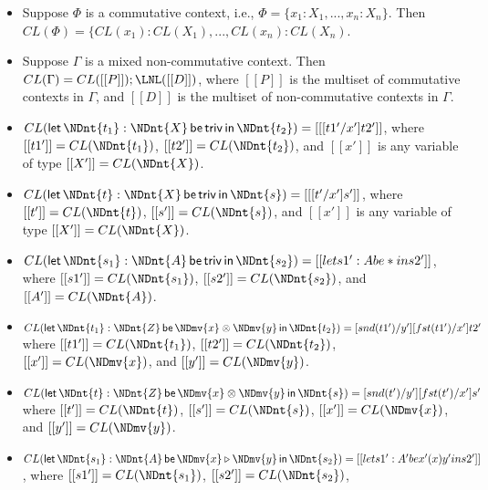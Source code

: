 \begin{definition}
\begin{itemize}
  \item Suppose $\Phi$ is a commutative context, i.e.,
        $\Phi=\{x_1:X_1,...,x_n:X_n\}$. Then \\
        $CL(\Phi)=\{CL(x_1):CL(X_1),...,CL(x_n):CL(X_n)$.
  \item Suppose $\Gamma$ is a mixed non-commutative context. Then
        $CL(\Gamma)=CL([[P]]);\LNL([[D]])$, where $[[P]]$ is the multiset of
        commutative contexts in $\Gamma$, and $[[D]]$ is the multiset of
        non-commutative contexts in $\Gamma$.
  \item $CL( \mathsf{let}\, \NDnt{t_{{\mathrm{1}}}}  :  \NDnt{X} \,\mathsf{be}\,  \mathsf{triv}  \,\mathsf{in}\, \NDnt{t_{{\mathrm{2}}}} ) = [[ [ t1' / x' ] t2' ]]$,
        where $[[t1']] = CL(\NDnt{t_{{\mathrm{1}}}})$, $[[t2']] = CL(\NDnt{t_{{\mathrm{2}}}})$, and $[[x']]$
        is any variable of type $[[X']] = CL(\NDnt{X})$.
  \item $CL( \mathsf{let}\, \NDnt{t}  :  \NDnt{X} \,\mathsf{be}\,  \mathsf{triv}  \,\mathsf{in}\, \NDnt{s} ) = [[ [ t' / x' ] s' ]]$,
        where $[[t']] = CL(\NDnt{t})$, $[[s']] = CL(\NDnt{s})$, and $[[x']]$
        is any variable of type $[[X']] = CL(\NDnt{X})$.
  \item $CL( \mathsf{let}\, \NDnt{s_{{\mathrm{1}}}}  :  \NDnt{A} \,\mathsf{be}\,  \mathsf{triv}  \,\mathsf{in}\, \NDnt{s_{{\mathrm{2}}}} ) = [[let s1' : A be * in s2']]$,
        where $[[s1']] = CL(\NDnt{s_{{\mathrm{1}}}})$, $[[s2']] = CL(\NDnt{s_{{\mathrm{2}}}})$, and
        $[[A']] = CL(\NDnt{A})$.
  \item $CL( \mathsf{let}\, \NDnt{t_{{\mathrm{1}}}}  :  \NDnt{Z} \,\mathsf{be}\, \NDmv{x}  \otimes  \NDmv{y} \,\mathsf{in}\, \NDnt{t_{{\mathrm{2}}}} ) = [snd(t1') / y'][fst(t1') / x']t2'$
        where $[[t1']] = CL(\NDnt{t_{{\mathrm{1}}}})$, $[[t2']] = CL(\NDnt{t_{{\mathrm{2}}}})$,
        $[[x']] = CL(\NDmv{x})$, and $[[y']] = CL(\NDmv{y})$.
  \item $CL( \mathsf{let}\, \NDnt{t}  :  \NDnt{Z} \,\mathsf{be}\, \NDmv{x}  \otimes  \NDmv{y} \,\mathsf{in}\, \NDnt{s} ) = [snd(t') / y'][fst(t') / x']s'$
        where $[[t']] = CL(\NDnt{t})$, $[[s']] = CL(\NDnt{s})$,
        $[[x']] = CL(\NDmv{x})$, and $[[y']] = CL(\NDmv{y})$.
  \item $CL( \mathsf{let}\, \NDnt{s_{{\mathrm{1}}}}  :  \NDnt{A} \,\mathsf{be}\, \NDmv{x}  \triangleright  \NDmv{y} \,\mathsf{in}\, \NDnt{s_{{\mathrm{2}}}} ) = [[let s1' : A' be x' (x) y' in s2']]$,
        where $[[s1']] = CL(\NDnt{s_{{\mathrm{1}}}})$, $[[s2']] = CL(\NDnt{s_{{\mathrm{2}}}})$,

\end{itemize}
\end{definition}
